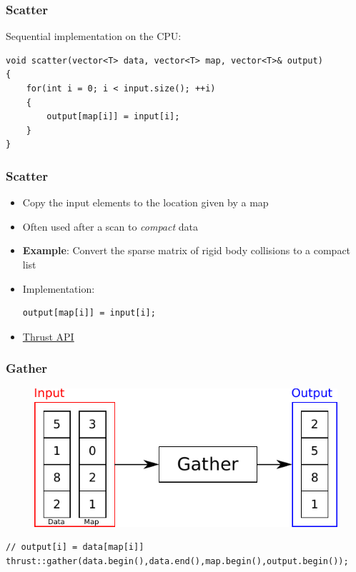 \documentclass[aspectratio=169]{beamer}
\begin{document}
\begin{frame}[fragile]
	\frametitle{Scatter}
	Sequential implementation on the CPU:
\begin{lstlisting}
void scatter(vector<T> data, vector<T> map, vector<T>& output)
{
	for(int i = 0; i < input.size(); ++i)
	{
		output[map[i]] = input[i];
	}
}
\end{lstlisting}
\end{frame}



\begin{frame}[fragile]
\frametitle{Scatter}
	\begin{itemize}
	\item Copy the input elements to the location given by a map
	\item<2-> Often used after a scan to \textit{compact} data
	\item<2-> \textbf{Example}: Convert the sparse matrix of rigid body collisions to a compact list
	\item<3-> Implementation:

\begin{lstlisting}
output[map[i]] = input[i];
\end{lstlisting}
	\item<3-> \href{https://thrust.github.io/doc/group__scattering.html}{Thrust API}
\end{itemize} 	
\end{frame}

\begin{frame}[fragile]
\frametitle{Gather}
\begin{figure}
	\centering
	\includegraphics[height=0.6\textheight]{o_gather}
\end{figure}

\begin{lstlisting}
// output[i] = data[map[i]]
thrust::gather(data.begin(),data.end(),map.begin(),output.begin());
\end{lstlisting}
\end{frame}
\end{document}

